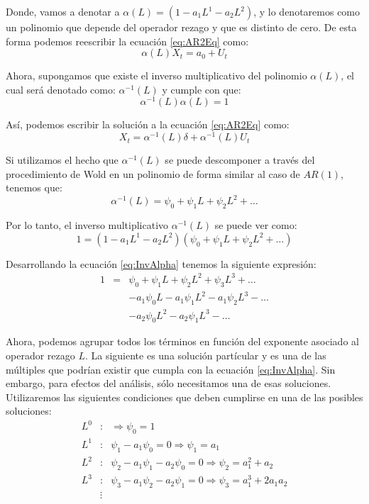 \documentclass[
]{book}
\begin{document}
Donde, vamos a denotar a \(\alpha (L) = (1 - a_1 L^1 - a_2 L^2)\), y lo denotaremos como un polinomio que depende del operador rezago y que es distinto de cero. De esta forma podemos reescribir la ecuación \eqref{eq:AR2Eq} como:
\begin{equation}
    \alpha(L) X_t = a_0 + U_t
\end{equation}

Ahora, supongamos que existe el inverso multiplicativo del polinomio \(\alpha(L)\), el cual será denotado como: \(\alpha^{-1}(L)\) y cumple con que:
\begin{equation}
    \alpha^{-1}(L) \alpha(L) = 1    
\end{equation}

Así, podemos escribir la solución a la ecuación \eqref{eq:AR2Eq} como:
\begin{equation*}
    X_t = \alpha^{-1}(L) \delta + \alpha^{-1}(L) U_t
\end{equation*}

Si utilizamos el hecho que \(\alpha^{-1}(L)\) se puede descomponer a través del procedimiento de Wold en un polinomio de forma similar al caso de \(AR(1)\), tenemos que:
\begin{equation}
    \alpha^{-1}(L) = \psi_0 + \psi_1 L + \psi_2 L^2 + \ldots
\end{equation}

Por lo tanto, el inverso multiplicativo \(\alpha^{-1}(L)\) se puede ver como:
\begin{equation}
    1 = (1 - a_1 L^1 - a_2 L^2) (\psi_0 + \psi_1 L + \psi_2 L^2 + \ldots)
    \label{eq:InvAlpha}
\end{equation}

Desarrollando la ecuación \eqref{eq:InvAlpha} tenemos la siguiente expresión:
\begin{eqnarray*}
  1 & = & \psi_0 + \psi_1 L + \psi_2 L^2 + \psi_3 L^3 + \ldots \\
  &  &  - a_1 \psi_0 L - a_1 \psi_1 L^2 - a_1 \psi_2 L^3 - \ldots \\
  &  &  - a_2 \psi_0 L^2 - a_2 \psi_1 L^3 - \ldots
\end{eqnarray*}

Ahora, podemos agrupar todos los términos en función del exponente asociado al operador rezago \(L\). La siguiente es una solución partícular y es una de las múltiples que podrían existir que cumpla con la ecuación \eqref{eq:InvAlpha}. Sin embargo, para efectos del análisis, sólo necesitamos una de esas soluciones. Utilizaremos las siguientes condiciones que deben cumplirse en una de las posibles soluciones:
\begin{eqnarray*}
  L^0 & : & \Rightarrow \psi_0 = 1 \\
  L^1 & : & \psi_1 - a_1 \psi_0 = 0 \Rightarrow \psi_1 = a_1 \\
  L^2 & : & \psi_2 - a_1 \psi_1 - a_2 \psi_0 = 0 \Rightarrow \psi_2 = a^2_1 + a_2 \\
  L^3 & : & \psi_3 - a_1 \psi_2 - a_2 \psi_1 = 0 \Rightarrow \psi_3 = a^3_1 + 2 a_1 a_2 \\
  & \vdots & 
\end{eqnarray*}
\end{document}
